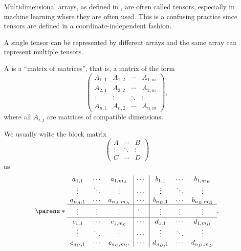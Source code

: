 \begin{remark}\label{rem:arrays_vs_tensors}
  Multidimensional arrays, as defined in , are often called tensors, especially in machine learning where they are often used. This is a confusing practice since tensors are defined in a coordinate-independent fashion.

  A single tensor can be represented by different arrays and the same array can represent multiple tensors.
\end{remark}

\begin{definition}\label{def:block_matrix}
  A  is a \enquote{matrix of matrices}, that is, a matrix of the form
  \begin{equation*}
    \begin{pmatrix}
      A_{1,1} & A_{1,2} & \cdots & A_{1,m} \\
      A_{2,1} & A_{2,2} & \cdots & A_{2,m} \\
      \vdots  & \vdots  & \ddots & \vdots  \\
      A_{n,1} & A_{n,2} & \cdots & A_{n,m}
    \end{pmatrix},
  \end{equation*}
  where all \( A_{i,j} \) are matrices of compatible dimensions.

  We usually write the block matrix
  \begin{equation*}
    \begin{pmatrix}
      A      & \cdots & B      \\
      \vdots & \ddots & \vdots \\
      C      & \cdots & D
    \end{pmatrix}
  \end{equation*}
  as
  \begin{equation*}
    \parens*{\begin{array}{ccc|c|ccc}
      a_{1,1}   & \cdots & a_{1,m_A}   & \cdots & b_{1,1}   & \cdots & b_{1,m_B} \\
      \vdots    & \ddots & \vdots      & \cdots & \vdots    & \ddots & \vdots \\
      a_{n_A,1} & \cdots & a_{n_A,m_A} & \cdots & b_{n_B,1} & \cdots & b_{n_B,m_B} \\
      \hline
      \vdots    & \vdots & \vdots      & \ddots & \vdots    & \vdots & \vdots \\
      \hline
      c_{1,1}   & \cdots & c_{1,m_C}   & \cdots & d_{1,1}   & \cdots & d_{1,m_D} \\
      \vdots    & \ddots & \vdots      & \cdots & \vdots    & \ddots & \vdots \\
      c_{n_C,1} & \cdots & c_{n_C,m_C} & \cdots & d_{n_D,1} & \cdots & d_{n_D,m_D} \\
    \end{array}}.
  \end{equation*}


\end{definition}
